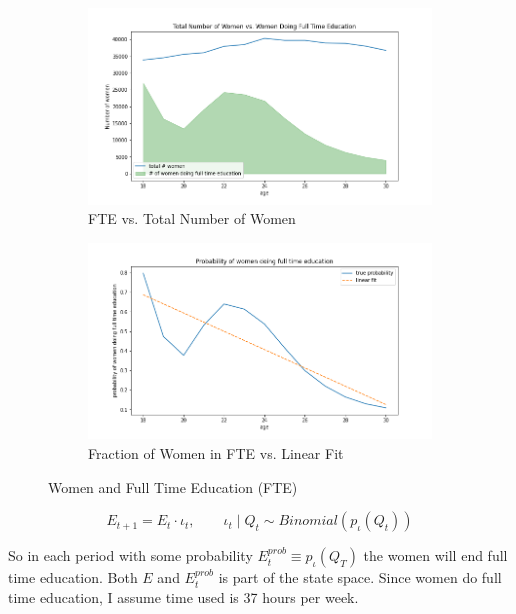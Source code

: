 \begin{figure}[ht]
\begin{subfigure}{.5\textwidth}
  \centering
  \includegraphics[width=1\linewidth]{figures/total_women_vs_education.png}
  \caption{FTE vs. Total Number of Women}
  \label{fig:educ_empirical}
\end{subfigure}%
\begin{subfigure}{.5\textwidth}
  \centering
  \includegraphics[width=1\linewidth]{figures/prop_women_doing_full_time_education.png}
  \caption{Fraction of Women in FTE vs. Linear Fit}
  \label{fig:prob_educ_full_time}
\end{subfigure}
    \caption{Women and Full Time Education (FTE)}
    \label{fig:educ_women}
\end{figure}

\begin{equation}
    E_{t+1} = E_{t} \cdot \iota_t, \qquad \iota_t \mid Q_t \sim  Binomial(p_{\iota}(Q_t))
\end{equation}

So in each period with some probability $E^{prob}_t \equiv p_{\iota}(Q_T)$ the women will end full time education. Both $E$ and $E^{prob}_t$ is part of the state space. Since women do full time education, I assume time used is 37 hours per week.

